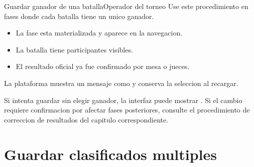 \begin{procedimiento}{Guardar ganador de una batalla}{Operador del torneo}
Use este procedimiento en fases donde cada batalla tiene un unico ganador.
\end{procedimiento}

\begin{precondiciones}
\begin{itemize}
    \item La fase esta materializada y aparece en la navegacion.
    \item La batalla tiene participantes visibles.
    \item El resultado oficial ya fue confirmado por mesa o jueces.
\end{itemize}
\end{precondiciones}


\begin{resultadoesperado}
La plataforma muestra un mensaje como  y conserva la seleccion al recargar.
\end{resultadoesperado}

\begin{fallas}
Si intenta guardar sin elegir ganador, la interfaz puede mostrar . Si el cambio requiere confirmacion por afectar fases posteriores, consulte el procedimiento de correccion de resultados del capitulo correspondiente.
\end{fallas}

\section{Guardar clasificados multiples}


